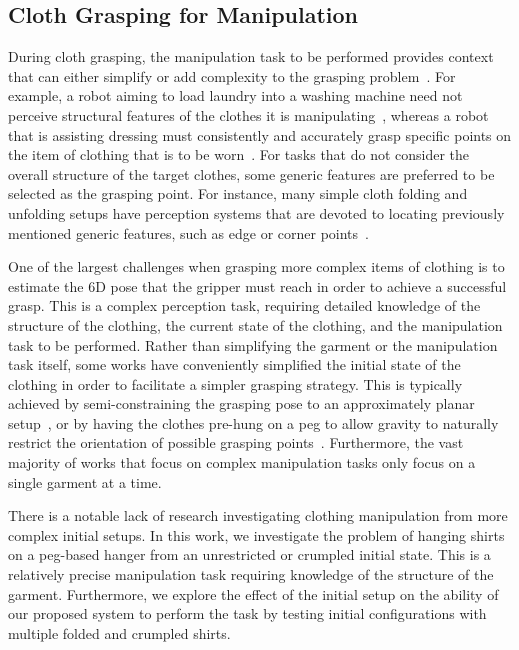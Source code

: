 \documentclass[letterpaper, 10 pt, conference]{ieeeconf}  %
\begin{document}
\subsection{Cloth Grasping for Manipulation}
During cloth grasping, the manipulation task to be performed provides context that can either simplify or add complexity to the grasping problem~\cite{jimenez2020perception}. For example, a robot aiming to load laundry into a washing machine need not perceive structural features of the clothes it is manipulating~\cite{shehawy2021estimating}, whereas a robot that is assisting dressing must consistently and accurately grasp specific points on the item of clothing that is to be worn~\cite{saxena2019garment, zhang2020learning}. For tasks that do not consider the overall structure of the target clothes, some generic features are preferred to be selected as the grasping point. For instance, many simple cloth folding and unfolding setups have perception systems that are devoted to locating previously mentioned generic features, such as edge or corner points~\cite{maitin2010cloth, triantafyllou2011vision, weng2022fabricflownet}.

One of the largest challenges when grasping more complex items of clothing is to estimate the 6D pose that the gripper must reach in order to achieve a successful grasp. This is a complex perception task, requiring detailed knowledge of the structure of the clothing, the current state of the clothing, and the manipulation task to be performed. Rather than simplifying the garment or the manipulation task itself, some works have conveniently simplified the initial state of the clothing in order to facilitate a simpler grasping strategy. This is typically achieved by semi-constraining the grasping pose to an approximately planar setup~\cite{ha2022flingbot, seita_bedmake_2019, matas2018sim}, or by having the clothes pre-hung on a peg to allow gravity to naturally restrict the orientation of possible grasping points~\cite{saxena2019garment, zhang2020learning, zhang2022learning}. Furthermore, the vast majority of works that focus on complex manipulation tasks only focus on a single garment at a time.

There is a notable lack of research investigating clothing manipulation from more complex initial setups. In this work, we investigate the problem of hanging shirts on a peg-based hanger from an unrestricted or crumpled initial state. This is a relatively precise manipulation task requiring knowledge of the structure of the garment. Furthermore, we explore the effect of the initial setup on the ability of our proposed system to perform the task by testing initial configurations with multiple folded and crumpled shirts.
\end{document}

